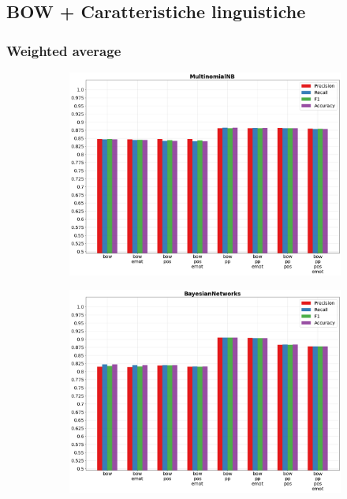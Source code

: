 \documentclass[oneside]{book}
\begin{document}
\newpage
\subsection{BOW + Caratteristiche linguistiche}

\subsubsection{Weighted average}
\vfill
\begin{figure}[!h]
	\hspace*{-3cm}
	\begin{subfigure}[b]{0.5\textwidth}
		\centering
		\includegraphics[width=10cm]{assets/reports/macro/bow/MultinomialNB.png}
	\end{subfigure}
	\hfill
	\begin{subfigure}[b]{0.5\textwidth}
		\centering
		\hspace*{0.15cm}
		\includegraphics[width=10cm]{assets/reports/macro/bow/BayesianNetworks.png}
	\end{subfigure}
\end{figure}
\vfill
\end{document}
